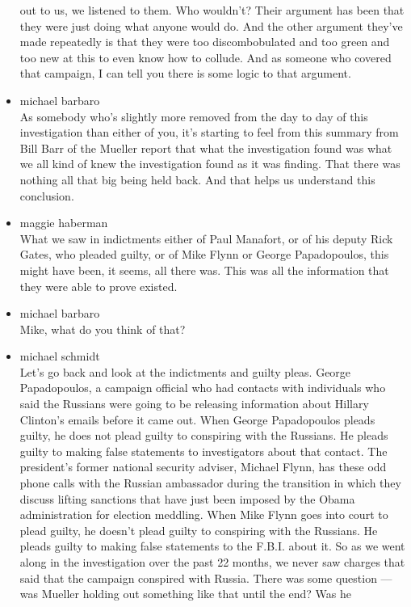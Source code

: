 \begin{itemize}
  out to us, we listened to them. Who wouldn't? Their argument has been
  that they were just doing what anyone would do. And the other argument
  they've made repeatedly is that they were too discombobulated and too
  green and too new at this to even know how to collude. And as someone
  who covered that campaign, I can tell you there is some logic to that
  argument.
\item
  michael barbaro\\
  As somebody who's slightly more removed from the day to day of this
  investigation than either of you, it's starting to feel from this
  summary from Bill Barr of the Mueller report that what the
  investigation found was what we all kind of knew the investigation
  found as it was finding. That there was nothing all that big being
  held back. And that helps us understand this conclusion.
\item
  maggie haberman\\
  What we saw in indictments either of Paul Manafort, or of his deputy
  Rick Gates, who pleaded guilty, or of Mike Flynn or George
  Papadopoulos, this might have been, it seems, all there was. This was
  all the information that they were able to prove existed.
\item
  michael barbaro\\
  Mike, what do you think of that?
\item
  michael schmidt\\
  Let's go back and look at the indictments and guilty pleas. George
  Papadopoulos, a campaign official who had contacts with individuals
  who said the Russians were going to be releasing information about
  Hillary Clinton's emails before it came out. When George Papadopoulos
  pleads guilty, he does not plead guilty to conspiring with the
  Russians. He pleads guilty to making false statements to investigators
  about that contact. The president's former national security adviser,
  Michael Flynn, has these odd phone calls with the Russian ambassador
  during the transition in which they discuss lifting sanctions that
  have just been imposed by the Obama administration for election
  meddling. When Mike Flynn goes into court to plead guilty, he doesn't
  plead guilty to conspiring with the Russians. He pleads guilty to
  making false statements to the F.B.I. about it. So as we went along in
  the investigation over the past 22 months, we never saw charges that
  said that the campaign conspired with Russia. There was some question
  --- was Mueller holding out something like that until the end? Was he

\end{itemize}
